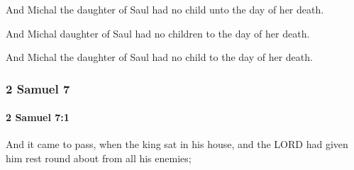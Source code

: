 			\begin{versebox}
					\item[BHS] 
					\item[ASV] And Michal the daughter of Saul had no child unto the day of her death.
					\item[NIV] And Michal daughter of Saul had no children to the day of her death.
					\item[NRSV] And Michal the daughter of Saul had no child to the day of her death.
			\end{versebox}
	\subsubsection{2 Samuel 7} %
		\label{2SAMUEL-7}

		\paragraph{2 Samuel 7:1} %
			\label{2SAMUEL-7-1}

			And it came to pass, when the king sat in his house, and the LORD had given him rest round about from all his enemies;

